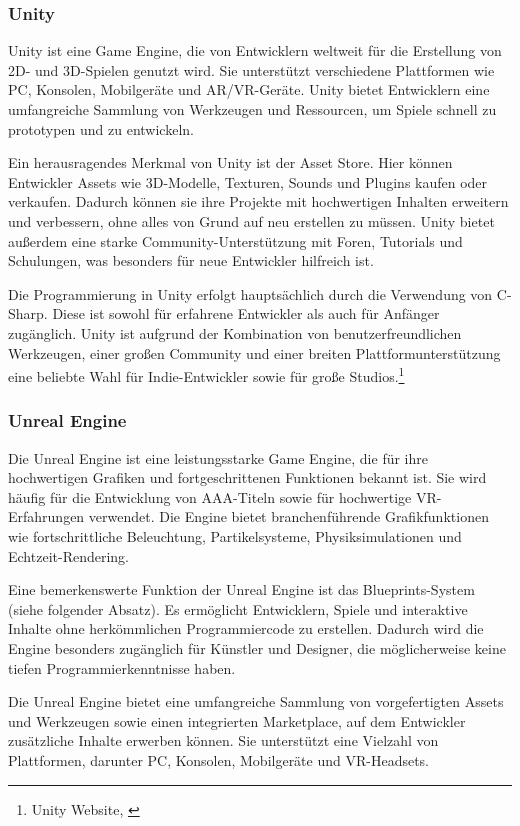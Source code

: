 \subsubsection{Unity}
Unity ist eine Game Engine, die von Entwicklern weltweit für die Erstellung von 2D- und 3D-Spielen genutzt wird. Sie
unterstützt verschiedene Plattformen wie PC, Konsolen, Mobilgeräte und AR/VR-Geräte. Unity bietet Entwicklern eine
umfangreiche Sammlung von Werkzeugen und Ressourcen, um Spiele schnell zu prototypen und zu entwickeln.

Ein herausragendes Merkmal von Unity ist der Asset Store. Hier können Entwickler Assets wie 3D-Modelle, Texturen, Sounds
und Plugins kaufen oder verkaufen. Dadurch können sie ihre Projekte mit hochwertigen Inhalten erweitern und verbessern,
ohne alles von Grund auf neu erstellen zu müssen. Unity bietet außerdem eine starke Community-Unterstützung mit Foren,
Tutorials und Schulungen, was besonders für neue Entwickler hilfreich ist.

Die Programmierung in Unity erfolgt hauptsächlich durch die Verwendung von C-Sharp. Diese ist sowohl für
erfahrene Entwickler als auch für Anfänger zugänglich. Unity ist aufgrund der Kombination von benutzerfreundlichen Werkzeugen,
einer großen Community und einer breiten Plattformunterstützung eine beliebte Wahl für Indie-Entwickler sowie für große Studios.\footnote{Unity Website, \cite{https://unity.com/}}

\subsubsection{Unreal Engine}
Die Unreal Engine ist eine leistungsstarke Game Engine, die für ihre hochwertigen Grafiken und fortgeschrittenen Funktionen
bekannt ist. Sie wird häufig für die Entwicklung von AAA-Titeln sowie für hochwertige VR-Erfahrungen verwendet. Die Engine
bietet branchenführende Grafikfunktionen wie fortschrittliche Beleuchtung, Partikelsysteme, Physiksimulationen und Echtzeit-Rendering.

Eine bemerkenswerte Funktion der Unreal Engine ist das Blueprints-System (siehe folgender Absatz). Es ermöglicht Entwicklern, Spiele und interaktive
Inhalte ohne herkömmlichen Programmiercode zu erstellen. Dadurch wird die Engine besonders zugänglich für Künstler und
Designer, die möglicherweise keine tiefen Programmierkenntnisse haben.

Die Unreal Engine bietet eine umfangreiche Sammlung von vorgefertigten Assets und Werkzeugen sowie einen integrierten
Marketplace, auf dem Entwickler zusätzliche Inhalte erwerben können. Sie unterstützt eine Vielzahl von Plattformen,
darunter PC, Konsolen, Mobilgeräte und VR-Headsets.

